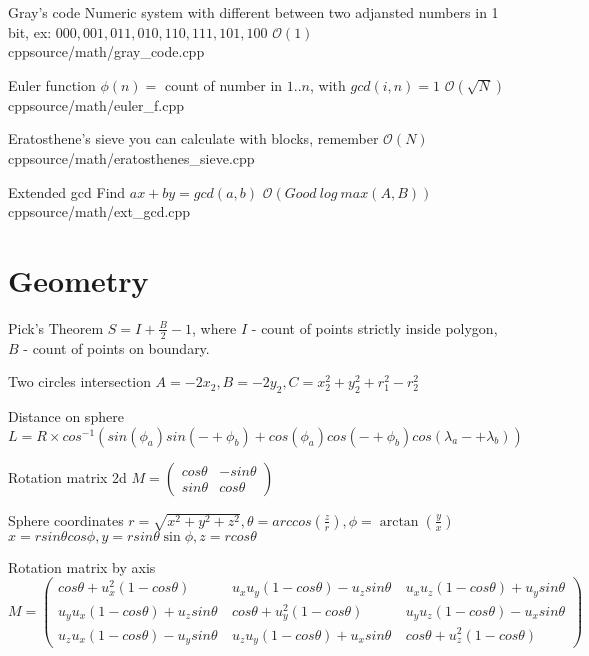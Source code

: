 \documentclass[landscape, 10pt, a4paper, oneside, twocolumn]{extarticle}
\begin{document}
\Algorithm
{Gray's code}
{Numeric system with different between two adjansted numbers in 1 bit, ex: $000, 001, 011, 010, 110, 111, 101, 100$}
{$\mathcal{O}(1)$}
{cpp}{source/math/gray_code.cpp}

\Algorithm
{Euler function}
{$\phi(n) = $ count of number in $1..n$, with $gcd(i, n) = 1$}
{$\mathcal{O}(\sqrt{N})$}
{cpp}{source/math/euler_f.cpp}

\Algorithm
{Eratosthene's sieve}
{you can calculate with blocks, remember}
{$\mathcal{O}(N)$}
{cpp}{source/math/eratosthenes_sieve.cpp}

\Algorithm
{Extended gcd}
{Find $a x + b y = gcd(a, b)$}
{$\mathcal{O}(Good\ log\ max(A, B))$}
{cpp}{source/math/ext_gcd.cpp}

\section{Geometry}

\Formula
{Pick's Theorem}
{$S = I + \frac{B}{2} - 1$, where $I$ - count of points strictly inside polygon, $B$ - count of points on boundary.}

\Formula
{Two circles intersection}
{$A = -2 x_{2}, B = - 2 y_{2}, C = x_{2}^{2} + y_{2}^{2} + r_{1}^{2} - r_{2}^{2}$}

\Formula
{Distance on sphere}
{$L = R \times cos^{-1}( sin(\phi_{a}) sin(-+ \phi_{b}) + cos(\phi_{a}) cos(-+ \phi_{b}) cos(\lambda_{a} -+ \lambda_{b}) ) $}

\Formula
{Rotation matrix 2d}
{$M = \left( \begin{smallmatrix} cos\theta & - sin\theta \\ sin\theta & cos\theta \end{smallmatrix} \right)$}

\Formula
{Sphere coordinates}
{
    $r = \sqrt{x^{2} + y^{2} + z^{2}}, \theta = arccos(\frac{z}{r}), \phi = \arctan(\frac{y}{x})$ \\
    $x = r sin \theta cos \phi, y = r sin \theta \sin \phi, z = r cos \theta$ \\ 
}    

\Formula
{Rotation matrix by axis}
{ $ M = 
	\left ( 
		\begin{smallmatrix} 
			cos\theta + u_{x}^{2} (1 - cos\theta) \  & u_{x} u_{y} (1 - cos\theta) - u_{z} sin\theta \ & u_{x} u_{z} (1 - cos\theta) + u_{y} sin\theta \\ 
			u_{y} u_{x} (1 - cos\theta) + u_{z} sin\theta \ & cos\theta + u_{y}^{2} (1 - cos\theta) \ & u_{y} u_{z} (1 - cos\theta) - u_{x} sin\theta \\ 
			u_{z} u_{x} (1 - cos\theta) - u_{y} sin\theta \ & u_{z} u_{y} (1 - cos\theta) + u_{x} sin\theta \ & cos\theta + u_{z}^{2} (1 - cos\theta)
		\end{smallmatrix} 
	\right ) $
}
\end{document}
